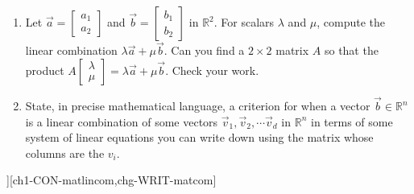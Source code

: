 \begin{SaveQuestion}
{\begin{enumerate}
	   \item Let $\vec a = \begin{bmatrix} a_1\\  a_2 \end{bmatrix}$ and $\vec b =  \begin{bmatrix} b_1 \\ b_2 \end{bmatrix}$ in $\mathbb R^2$. For scalars $\lambda$ and $\mu$,   compute the linear combination $\lambda \vec a + \mu \vec b$. Can you find a $2\times 2$ matrix $A$ so that the product $ A \begin{bmatrix} \lambda \\ \mu  \end{bmatrix} = \lambda \vec a + \mu \vec b$. Check your work.
	   \item State,  in precise mathematical language, a criterion  for when a vector $\vec b \in \mathbb R^n$ is a linear combination of some vectors $\vec v_1, \vec v_2, \cdots \vec v_d$ in $\mathbb R^n$  in terms of some system of linear equations you can write down using the matrix whose columns are the $v_i$. 
        \end{enumerate}
}][ch1-CON-matlincom,chg-WRIT-matcom] %
\end{SaveQuestion}


